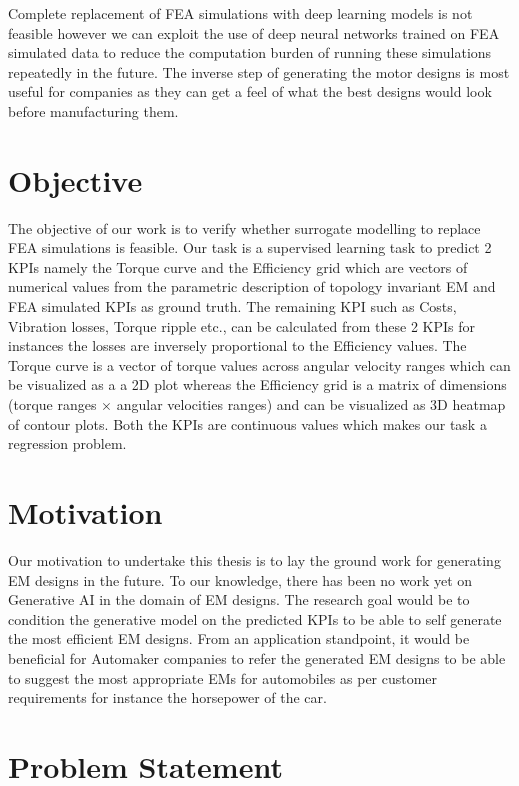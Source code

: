 \documentclass{report} %
\begin{document}
Complete replacement of \ac{FEA} simulations with deep learning models is not feasible however we can exploit the use of deep neural networks 
trained on \ac{FEA} simulated data to reduce the computation burden of running these simulations repeatedly in the future.
The inverse step of generating the motor designs is most useful for companies as they can get a feel of what the best designs would look before manufacturing them.

\section{Objective}\label{sec:Objective}
The objective of our work is to verify whether surrogate modelling to replace \ac{FEA} simulations is feasible.
Our task is a supervised learning task to predict 2 KPIs namely the Torque curve and the Efficiency grid which are vectors of numerical values  
from the parametric description of topology invariant \ac{EM} and \ac{FEA} simulated KPIs as ground truth. 
The remaining \ac{KPI} such as Costs, Vibration losses, Torque ripple etc., can be calculated from these 2 KPIs for instances the losses are inversely proportional to the Efficiency values.
The Torque curve is a vector of torque values across angular velocity ranges which can be visualized as a a 2D plot whereas the Efficiency grid is a matrix of 
dimensions (torque ranges $\times$ angular velocities ranges) and can be visualized as 3D heatmap of contour plots. 
Both the \ac{KPI}s are continuous values which makes our task a regression problem. 

\section{Motivation}\label{sec:Motivation}
Our motivation to undertake this thesis is to lay the ground work for generating \ac{EM} designs in the future. To our knowledge, there has been no work yet on Generative 
AI in the domain of \ac{EM} designs. The research goal would be to condition the generative model on the predicted \ac{KPI}s to be able to self generate the most efficient \ac{EM} 
designs. From an application standpoint, it would be beneficial for Automaker companies to refer the generated \ac{EM} designs to be able to suggest the most appropriate \ac{EM}s 
for automobiles as per customer requirements for instance the horsepower of the car.

\section{Problem Statement}\label{sec:Problem Statement}
\end{document}
